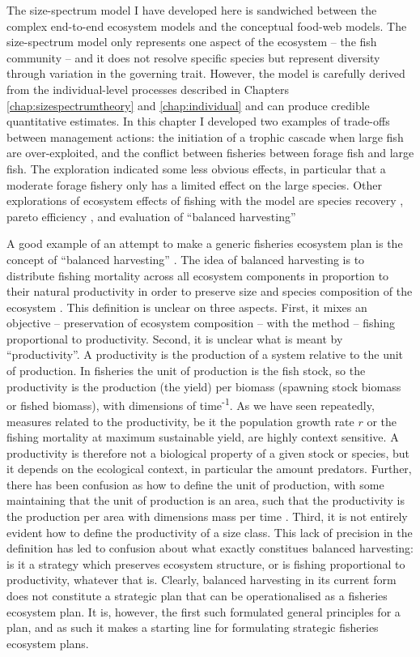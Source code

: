 The size-spectrum model I have developed here is sandwiched between the complex end-to-end ecosystem models and the conceptual food-web models.  The size-spectrum model only represents one aspect of the ecosystem -- the fish community -- and it does not resolve specific species but represent diversity through variation in the governing trait.  However, the model is carefully derived from the individual-level processes described in Chapters \ref{chap:sizespectrumtheory} and \ref{chap:individual} and can produce credible quantitative estimates.  In this chapter I developed two examples of trade-offs between management actions: the initiation of a trophic cascade when large fish are over-exploited, and the conflict between fisheries between forage fish and large fish.  The exploration indicated some less obvious effects, in particular that a moderate forage fishery only has a limited effect on the large species.  Other explorations of ecosystem effects of fishing with the model are species recovery \citep{Andersen2010b}, pareto efficiency \citep{Jacobsen2017}, and evaluation of ``balanced harvesting'' \citep{Jacobsen2014, Kolding2016}

A good example of an attempt to make a generic fisheries ecosystem plan is the concept of ``balanced harvesting'' \citep{Zhou2010}.  The idea of balanced harvesting is to distribute fishing mortality across all ecosystem components in proportion to their natural productivity in order to preserve size and species composition of the ecosystem \citep{Garcia2012}.  This definition is unclear on three aspects.  First, it mixes an objective -- preservation of ecosystem composition -- with the method -- fishing proportional to productivity.  Second, it is unclear what is meant by ``productivity''.  A productivity is the production of a system relative to the unit of production. In fisheries the unit of production is the fish stock, so the productivity is the production (the yield) per biomass (spawning stock biomass or fished biomass), with dimensions of time\textsuperscript{-1}.  As we have seen repeatedly, measures related to the productivity, be it the population growth rate $r$ or the fishing mortality at maximum sustainable yield, are highly context sensitive.  A productivity is therefore not a biological property of a given stock or species, but it depends on the ecological context, in particular the amount predators.  Further, there has been confusion as how to define the unit of production, with some maintaining that the unit of production is an area, such that the productivity is the production per area with dimensions mass per time \citep{Law2012, Law2013}.  Third, it is not entirely evident how to define the productivity of a size class.  This lack of precision in the definition has led to confusion about what exactly constitues balanced harvesting: is it a strategy which preserves ecosystem structure, or is fishing proportional to productivity, whatever that is.  Clearly, balanced harvesting in its current form does not constitute a strategic plan that can be operationalised as a fisheries ecosystem plan.  It is, however, the first such formulated general principles for a plan, and as such it makes a starting line for formulating strategic fisheries ecosystem plans.


